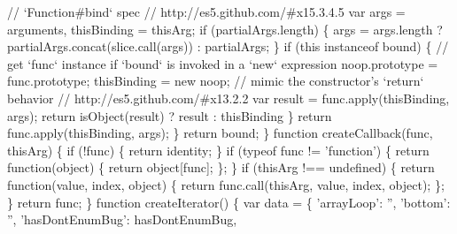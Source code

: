 \begin{DoxyCodeInclude}
{{\textcolor{stringliteral}{      // `Function#bind` spec}
\textcolor{stringliteral}{      // http://es5.github.com/#x15.3.4.5}
\textcolor{stringliteral}{      var args = arguments,}
\textcolor{stringliteral}{          thisBinding = thisArg;}
\textcolor{stringliteral}{}
\textcolor{stringliteral}{      if (partialArgs.length) \{}
\textcolor{stringliteral}{        args = args.length}
\textcolor{stringliteral}{          ? partialArgs.concat(slice.call(args))}
\textcolor{stringliteral}{          : partialArgs;}
\textcolor{stringliteral}{      \}}
\textcolor{stringliteral}{      if (this instanceof bound) \{}
\textcolor{stringliteral}{        // get `func` instance if `bound` is invoked in a `new` expression}
\textcolor{stringliteral}{        noop.prototype = func.prototype;}
\textcolor{stringliteral}{        thisBinding = new noop;}
\textcolor{stringliteral}{}
\textcolor{stringliteral}{        // mimic the constructor's `return` behavior}
\textcolor{stringliteral}{        // http://es5.github.com/#x13.2.2}
\textcolor{stringliteral}{        var result = func.apply(thisBinding, args);}
\textcolor{stringliteral}{        return isObject(result)}
\textcolor{stringliteral}{          ? result}
\textcolor{stringliteral}{          : thisBinding}
\textcolor{stringliteral}{      \}}
\textcolor{stringliteral}{      return func.apply(thisBinding, args);}
\textcolor{stringliteral}{    \}}
\textcolor{stringliteral}{    return bound;}
\textcolor{stringliteral}{  \}}
\textcolor{stringliteral}{}
\textcolor{stringliteral}{  function createCallback(func, thisArg) \{}
\textcolor{stringliteral}{    if (!func) \{}
\textcolor{stringliteral}{      return identity;}
\textcolor{stringliteral}{    \}}
\textcolor{stringliteral}{    if (typeof func != 'function') \{}
\textcolor{stringliteral}{      return function(object) \{}
\textcolor{stringliteral}{        return object[func];}
\textcolor{stringliteral}{      \};}
\textcolor{stringliteral}{    \}}
\textcolor{stringliteral}{    if (thisArg !== undefined) \{}
\textcolor{stringliteral}{      return function(value, index, object) \{}
\textcolor{stringliteral}{        return func.call(thisArg, value, index, object);}
\textcolor{stringliteral}{      \};}
\textcolor{stringliteral}{    \}}
\textcolor{stringliteral}{    return func;}
\textcolor{stringliteral}{  \}}
\textcolor{stringliteral}{}
\textcolor{stringliteral}{  function createIterator() \{}
\textcolor{stringliteral}{    var data = \{}
\textcolor{stringliteral}{      'arrayLoop': '',}
\textcolor{stringliteral}{      'bottom': '',}
\textcolor{stringliteral}{      'hasDontEnumBug': hasDontEnumBug,}
}}
\end{DoxyCodeInclude}
